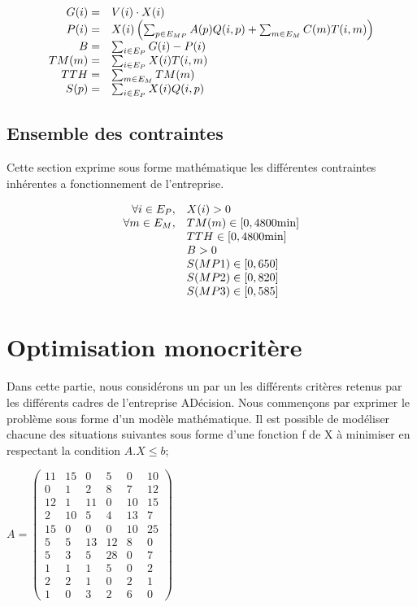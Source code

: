 \documentclass[a4paper, 11pt]{article}
\begin{document}
$$
\begin{array}{r l}
    G(i) =  & V(i)\cdot X(i) \\
    P(i) =  & X(i)\left(\sum_{p\in E_{MP}} A(p)Q(i, p)+ \sum_{m\in E_M} C(m)T(i, m)\right) \\
    B =     & \sum_{i\in E_P} G(i) - P(i) \\
    TM(m) = & \sum_{i\in E_P} X(i)T(i, m) \\
    TTH =   & \sum_{m\in E_M} TM(m) \\
    S(p) =  & \sum_{i\in E_P} X(i)Q(i, p) \\
\end{array}
$$

\subsection{Ensemble des contraintes}
Cette section exprime sous forme mathématique les différentes contraintes
inhérentes a fonctionnement de l'entreprise.

$$
\begin{array}{r l}
    \forall i\in E_P, & X(i) > 0 \\
    \forall m\in E_M, & TM(m) \in [0, 4800\mbox{min}] \\
                      & TTH \in [0, 4800\mbox{min}] \\
                      & B > 0 \\
                      & S(MP1) \in [0, 650] \\
                      & S(MP2) \in [0, 820] \\
                      & S(MP3) \in [0, 585] \\
\end{array}
$$

\section{Optimisation monocritère}
Dans cette partie, nous considérons un par un les différents critères retenus
par les différents cadres de l’entreprise ADécision. Nous commençons par
exprimer le problème sous forme d’un modèle mathématique. Il est possible de
modéliser chacune des situations suivantes sous forme d’une fonction f de X à
minimiser en respectant la condition $A . X \leq b$;

$A = \begin{pmatrix}
11&15&0&5&0&10 \\
0&1&2&8&7&12\\
12&1&11&0&10&15\\
2&10&5&4&13&7\\
15&0&0&0&10&25\\
5&5&13&12&8&0\\
5&3&5&28&0&7\\
1&1&1&5&0&2\\
2&2&1&0&2&1\\
1&0&3&2&6&0
\end{pmatrix}$\\
\end{document}
